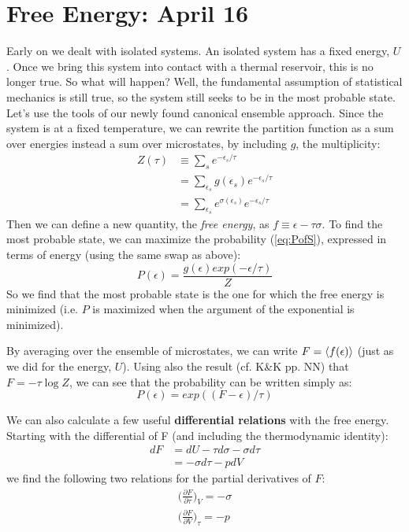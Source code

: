 \section{Free Energy: April 16}
Early on we dealt with isolated systems. An isolated system has a 
fixed energy, $U$. Once we bring this system into contact with a
thermal reservoir, this is no longer true. So what will happen?
Well, the fundamental assumption of statistical mechanics is still 
true, so the system still seeks to be in the most probable state. \\

Let's use the tools of our newly found canonical ensemble approach.
Since the system is at a fixed temperature, we can rewrite the
partition function as a sum over energies instead a sum over microstates,
by including $g$, the multiplicity:
\begin{align}
Z(\tau) &\equiv \sum_s e^{-\epsilon_s/\tau} \\
        &= \sum_{\epsilon_s} g(\epsilon_s) e^{-\epsilon_s/\tau} \\
        &= \sum_{\epsilon_s} e^{\sigma(\epsilon_s)} e^{-\epsilon_s/\tau}
\end{align}
Then we can define a new quantity, the \emph{free energy}, as
$f \equiv \epsilon - \tau \sigma$. To find the most probable state, we
can maximize the probability (\cref{eq:PofS}), expressed in terms of energy (using the
same swap as above):
\begin{equation}
P(\epsilon) = \frac{g(\epsilon) exp(-\epsilon/\tau)}{Z}
\end{equation}
So we find that the most probable state is the one for which the free energy is minimized (i.e. $P$ is maximized when the argument of the exponential is minimized).

By averaging over the ensemble of microstates, we can write 
$F = \Braket{f(\epsilon)}$ (just as we did for the energy, $U$). Using also the result (cf. K\&K pp. NN) that $F = -\tau \log Z$, we can see that the probability can be written simply as:
\begin{equation}
P(\epsilon) = exp((F - \epsilon)/\tau)
\end{equation}

We can also calculate a few useful \textbf{differential relations} with the free energy. Starting with the differential of F (and including the thermodynamic identity):
\begin{align}
dF &= dU - \tau d\sigma - \sigma d\tau \\
   &= -\sigma d\tau - p dV
\end{align}
we find the following two relations for the partial derivatives of $F$:
\begin{align}
\bigg(\frac{\partial F}{\partial \tau}\bigg)_V = -\sigma \\
\bigg(\frac{\partial F}{\partial V}\bigg)_\tau = -p
\end{align}

